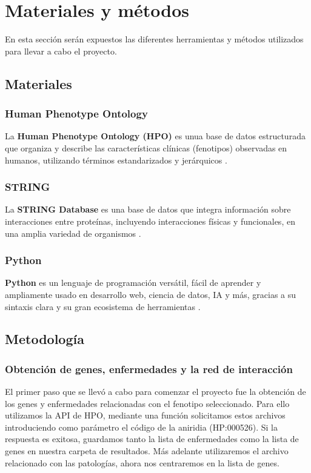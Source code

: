 \section{Materiales y métodos}

En esta sección serán expuestos las diferentes herramientas y métodos utilizados para llevar a cabo el proyecto.

\subsection{\textbf{Materiales}}
\subsubsection{Human Phenotype Ontology}

La \textbf{Human Phenotype Ontology (HPO)} es unua base de datos estructurada que organiza y describe las características clínicas (fenotipos) observadas en humanos, utilizando términos estandarizados y jerárquicos \cite{Gargano2024}.

\subsubsection{STRING}

La \textbf{STRING Database} es una base de datos que integra información sobre interacciones entre proteínas, incluyendo interacciones físicas y funcionales, en una amplia variedad de organismos \cite{STRING2024}.

\subsubsection{Python}

\textbf{Python} es un lenguaje de programación versátil, fácil de aprender y ampliamente usado en desarrollo web, ciencia de datos, IA y más, gracias a su sintaxis clara y su gran ecosistema de herramientas \cite{Python2024}.


\subsection{\textbf{Metodología}}

\subsubsection{Obtención de genes, enfermedades y la red de interacción}

El primer paso que se llevó a cabo para comenzar el proyecto fue la obtención de los genes y enfermedades relacionadas con el fenotipo seleccionado. Para ello utilizamos la API de HPO, mediante una función solicitamos estos archivos introduciendo como parámetro el código de la aniridia (HP:000526). Si la respuesta es exitosa, guardamos tanto la lista de enfermedades como la lista de genes en nuestra carpeta de resultados. Más adelante utilizaremos el archivo relacionado con las patologías, ahora nos centraremos en la lista de genes.


